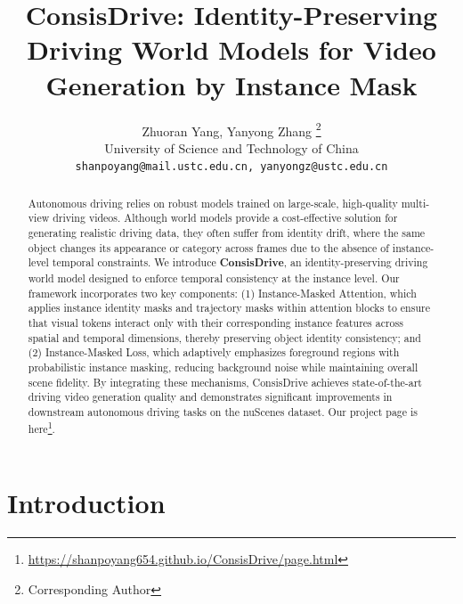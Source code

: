 \documentclass{article} %
\title{ConsisDrive: Identity-Preserving Driving World Models for Video Generation by Instance Mask}
\author{Zhuoran Yang, Yanyong Zhang \thanks{ Corresponding Author} \\
University of Science and Technology of China \\
\texttt{shanpoyang@mail.ustc.edu.cn, yanyongz@ustc.edu.cn} \\
}
\begin{document}
\maketitle

\begin{abstract}
Autonomous driving relies on robust models trained on large-scale, high-quality multi-view driving videos. 
Although world models provide a cost-effective solution for generating realistic driving data, they often suffer from identity drift, where the same object changes its appearance or category across frames due to the absence of instance-level temporal constraints. 
We introduce \textbf{ConsisDrive}, an identity-preserving driving world model designed to enforce temporal consistency at the instance level. 
Our framework incorporates two key components: (1) Instance-Masked Attention, which applies instance identity masks and trajectory masks within attention blocks 
to ensure that visual tokens interact only with their corresponding instance features across spatial and temporal dimensions, 
thereby preserving object identity consistency; 
and (2) Instance-Masked Loss, which adaptively emphasizes foreground regions with probabilistic instance masking, reducing background noise while maintaining overall scene fidelity. 
By integrating these mechanisms, ConsisDrive achieves state-of-the-art driving video generation quality and demonstrates significant improvements in downstream autonomous driving tasks on the nuScenes dataset.
Our project page is here\footnote{\url{https://shanpoyang654.github.io/ConsisDrive/page.html}}.
\end{abstract}





















\section{Introduction}
\label{section:intro}
\end{document}
